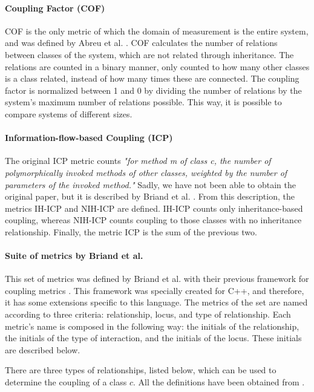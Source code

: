 \paragraph{Coupling Factor (COF)} COF is the only metric of which the domain of measurement is the entire system, and was defined by Abreu et al. \cite{abreu1995toward}. COF calculates the number of relations between classes of the system, which are not related through inheritance. The relations are counted in a binary manner, only counted to how many other classes is a class related, instead of how many times these are connected. The coupling factor is normalized between 1 and 0 by dividing the number of relations by the system's maximum number of relations possible. This way, it is possible to compare systems of different sizes.

\paragraph{Information-flow-based Coupling (ICP)} The original ICP metric counts \textit{"for method m of class c, the number of polymorphically invoked methods of other classes, weighted by the number of parameters of the invoked method."} Sadly, we have not been able to obtain the original paper, but it is described by Briand et al. \cite{briand1999unified}. From this description, the metrics IH-ICP and NIH-ICP are defined. IH-ICP counts only inheritance-based coupling, whereas NIH-ICP counts coupling to those classes with no inheritance relationship. Finally, the metric ICP is the sum of the previous two.

\paragraph{Suite of metrics by Briand et al.} This set of metrics was defined by Briand et al. with their previous framework for coupling metrics \cite{briand1997investigation}. This framework was specially created for C++, and therefore, it has some extensions specific to this language.
The metrics of the set are named according to three criteria: relationship, locus, and type of relationship. Each metric's name is composed in the following way: the initials of the relationship, the initials of the type of interaction, and the initials of the locus. These initials are described below.

\blankl
There are three types of relationships, listed below, which can be used to determine the coupling of a class $c$. All the definitions have been obtained from \cite{briand1997investigation}.

